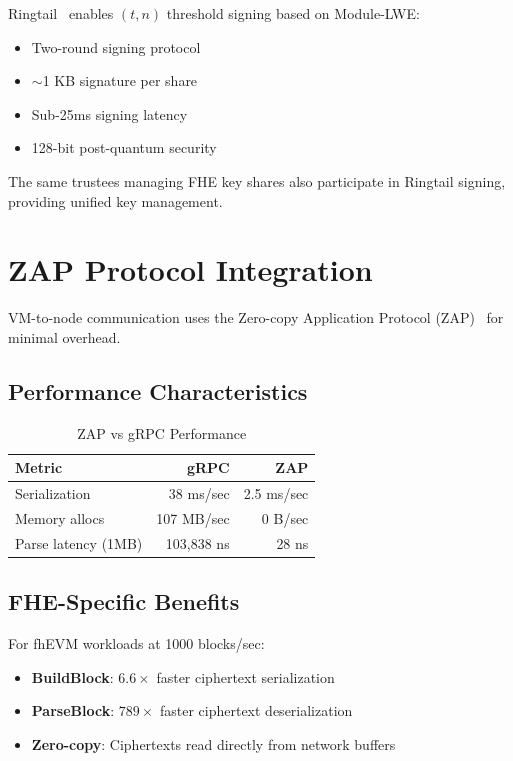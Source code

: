\documentclass{../shared/luxfhe}
\begin{document}
Ringtail~\cite{ringtail} enables $(t, n)$ threshold signing based on Module-LWE:

\begin{itemize}[noitemsep]
    \item Two-round signing protocol
    \item $\sim$1 KB signature per share
    \item Sub-25ms signing latency
    \item 128-bit post-quantum security
\end{itemize}

The same trustees managing FHE key shares also participate in Ringtail signing, providing unified key management.

\section{ZAP Protocol Integration}

VM-to-node communication uses the Zero-copy Application Protocol (ZAP)~\cite{zap} for minimal overhead.

\subsection{Performance Characteristics}

\begin{table}[h]
\centering
\caption{ZAP vs gRPC Performance}
\begin{tabular}{lrr}
\toprule
Metric & gRPC & ZAP \\
\midrule
Serialization & 38 ms/sec & 2.5 ms/sec \\
Memory allocs & 107 MB/sec & 0 B/sec \\
Parse latency (1MB) & 103,838 ns & 28 ns \\
\bottomrule
\end{tabular}
\end{table}

\subsection{FHE-Specific Benefits}

For fhEVM workloads at 1000 blocks/sec:

\begin{itemize}[noitemsep]
    \item \textbf{BuildBlock}: $6.6\times$ faster ciphertext serialization
    \item \textbf{ParseBlock}: $789\times$ faster ciphertext deserialization
    \item \textbf{Zero-copy}: Ciphertexts read directly from network buffers
\end{itemize}
\end{document}
